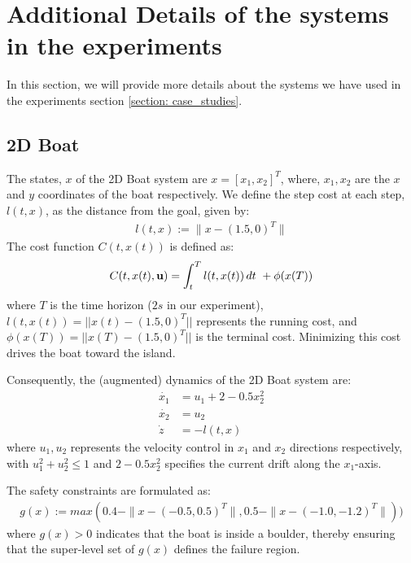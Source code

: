 \vspace{1em}
\section{Additional Details of the systems in the experiments}\label{appendix: system_details}

In this section, we will provide more details about the systems we have used in the experiments section \ref{section: case_studies}.


\subsection{2D Boat} \label{appendix: Boat2D}
The states, $x$ of the 2D Boat system are $x = [x_1, x_2]^T$, where, $x_1, x_2$ are the $x$ and $y$ coordinates of the boat respectively. We define the step cost at each step, $l(t,x)$, as the distance from the goal, given by:
\begin{align*}
    l(t,x) :=  \|x- (1.5, 0)^T\|
\end{align*}
The cost function $C(t, x(t))$ is defined as:  
\begin{equation}
 \begin{aligned}
     C(t,x(t), \mathbf{u}) = \int_t^{T} l(t, x(t)) \, dt ~ +
     \phi(x(T))
   \end{aligned}
\end{equation}
where $T$ is the time horizon ($2s$ in our experiment), $l(t, x(t)) = || x(t) - (1.5, 0)^T||$ represents the running cost, and $\phi(x(T)) = || x(T) - (1.5, 0)^T||$ is the terminal cost. Minimizing this cost drives the boat toward the island.

Consequently, the (augmented) dynamics of the 2D Boat system are:
\begin{align*}
    \dot{x_1} &= u_1 + 2 - 0.5 x_2^2 \\
    \dot{x_2} &= u_2 \\
    \dot{z} &= - l(t,x)
\end{align*}
where $u_1, u_2$ represents the velocity control in $x_1$ and $x_2$ directions respectively, with $u_1^2 + u_2^2 \leq 1$
and $2 - 0.5x_2^2$ specifies the current drift along the $x_1$-axis.

The safety constraints are formulated as:  
\begin{align}
    g(x) := max ( 0.4 - \|x - (-0.5, 0.5)^T \|,  0.5 - \|x - (-1.0, -1.2)^T \|) )
\end{align}
where $g(x) > 0$ indicates that the boat is inside a boulder, thereby ensuring that the super-level set of $g(x)$ defines the failure region.

